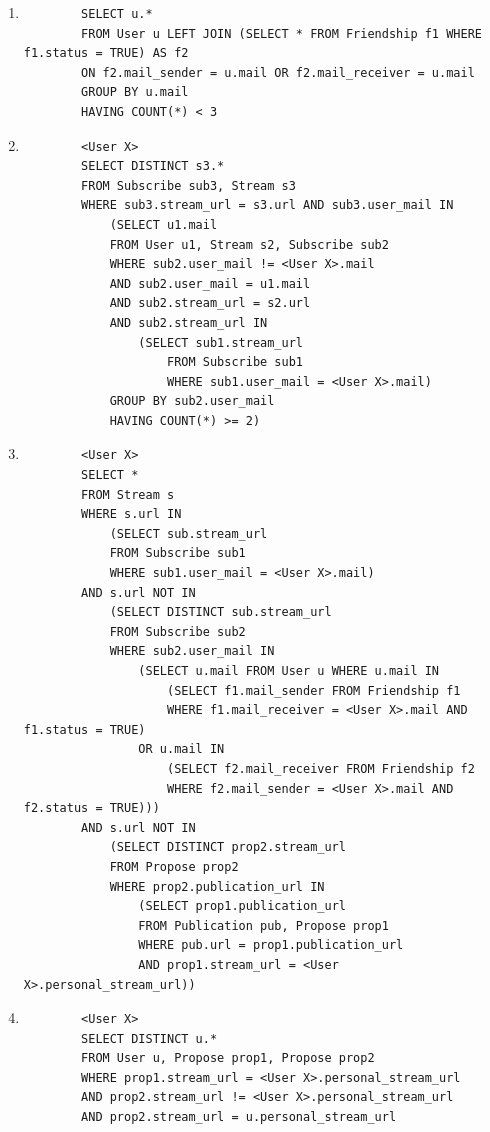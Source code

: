 \documentclass[a4paper,10pt]{article}
\begin{document}
	\begin{enumerate}
	    \item 
	    \begin{verbatim}
		SELECT u.*
		FROM User u LEFT JOIN (SELECT * FROM Friendship f1 WHERE f1.status = TRUE) AS f2 
		ON f2.mail_sender = u.mail OR f2.mail_receiver = u.mail
		GROUP BY u.mail
		HAVING COUNT(*) < 3
             \end{verbatim}
	    \item
             \begin{verbatim}
		<User X>
		SELECT DISTINCT s3.*
		FROM Subscribe sub3, Stream s3
		WHERE sub3.stream_url = s3.url AND sub3.user_mail IN
		    (SELECT u1.mail
		    FROM User u1, Stream s2, Subscribe sub2
		    WHERE sub2.user_mail != <User X>.mail
		    AND sub2.user_mail = u1.mail 
		    AND sub2.stream_url = s2.url 
		    AND sub2.stream_url IN    
		        (SELECT sub1.stream_url 
		            FROM Subscribe sub1 
		            WHERE sub1.user_mail = <User X>.mail)
		    GROUP BY sub2.user_mail
		    HAVING COUNT(*) >= 2)
             \end{verbatim}
	    \item
	    \begin{verbatim}
		<User X>
		SELECT *
		FROM Stream s
		WHERE s.url IN
		    (SELECT sub.stream_url
		    FROM Subscribe sub1
		    WHERE sub1.user_mail = <User X>.mail)
		AND s.url NOT IN
		    (SELECT DISTINCT sub.stream_url
		    FROM Subscribe sub2
		    WHERE sub2.user_mail IN
		        (SELECT u.mail FROM User u WHERE u.mail IN
		            (SELECT f1.mail_sender FROM Friendship f1 
		            WHERE f1.mail_receiver = <User X>.mail AND f1.status = TRUE)
		        OR u.mail IN
		            (SELECT f2.mail_receiver FROM Friendship f2 
		            WHERE f2.mail_sender = <User X>.mail AND f2.status = TRUE)))
		AND s.url NOT IN
		    (SELECT DISTINCT prop2.stream_url
		    FROM Propose prop2
		    WHERE prop2.publication_url IN
		        (SELECT prop1.publication_url
		        FROM Publication pub, Propose prop1
		        WHERE pub.url = prop1.publication_url 
		        AND prop1.stream_url = <User X>.personal_stream_url))
             \end{verbatim}
	    \item 
	    \begin{verbatim}
		<User X>
		SELECT DISTINCT u.*
		FROM User u, Propose prop1, Propose prop2
		WHERE prop1.stream_url = <User X>.personal_stream_url
		AND prop2.stream_url != <User X>.personal_stream_url
		AND prop2.stream_url = u.personal_stream_url

\end{verbatim}
\end{enumerate}
\end{document}
